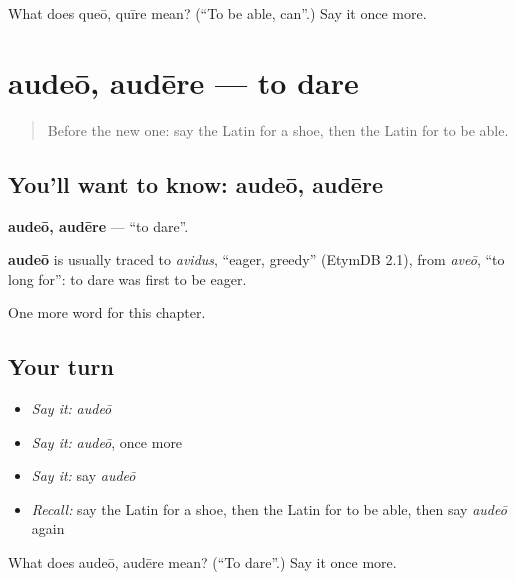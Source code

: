 \begin{tcolorbox}[breakable,colback=teal!4,colframe=teal!35!black,title={Before you move on}]
What does queō, quīre mean? (\textquotedblleft{}To be able, can\textquotedblright{}.) Say it once more.
\end{tcolorbox}
\section[audeō, audēre]{audeō, audēre — to dare}

\label{lesson:LA-C109-audeo}



\begin{quote}
Before the new one: say the Latin for a shoe, then the Latin for to be able.
\end{quote}

\subsection*{You'll want to know: audeō, audēre}
\textbf{audeō, audēre} — \textquotedblleft{}to dare\textquotedblright{}.

\begin{cousinweb}
\textbf{audeō} is usually traced to \emph{avidus}, \textquotedblleft{}eager, greedy\textquotedblright{} (EtymDB 2.1), from \emph{aveō}, \textquotedblleft{}to long for\textquotedblright{}: to dare was first to be eager.
\end{cousinweb}

\begin{grammarlens}[title={What you've built}]
One more word for this chapter.
\end{grammarlens}

\subsection*{Your turn}
\begin{itemize}
\raggedright
  \item \emph{Say it:} \emph{audeō}
  \item \emph{Say it:} \emph{audeō}, once more
  \item \emph{Say it:} say \emph{audeō}
  \item \emph{Recall:} say the Latin for a shoe, then the Latin for to be able, then say \emph{audeō} again
\end{itemize}

\begin{tcolorbox}[breakable,colback=teal!4,colframe=teal!35!black,title={Before you move on}]
What does audeō, audēre mean? (\textquotedblleft{}To dare\textquotedblright{}.) Say it once more.
\end{tcolorbox}
